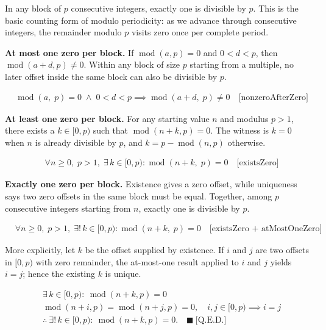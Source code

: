 In any block of $p$ consecutive integers, exactly one is divisible by $p$.
This is the basic counting form of modulo periodicity: as we advance through
consecutive integers, the remainder modulo $p$ visits zero once per complete
period.

\textbf{At most one zero per block.} If $\operatorname{mod}(a,p)=0$ and
$0 < d < p$, then $\operatorname{mod}(a+d,p)\neq 0$. Within any block of
size $p$ starting from a multiple, no later offset inside the same block can
also be divisible by $p$.

\begin{equation*}
\begin{aligned}
&\operatorname{mod}(a,\; p) = 0 \;\land\; 0 < d < p
  \implies \operatorname{mod}(a + d,\; p) \neq 0
  \quad \text{[nonzeroAfterZero]}
\end{aligned}
\end{equation*}

\textbf{At least one zero per block.} For any starting value $n$ and modulus
$p>1$, there exists a $k \in [0,p)$ such that
$\operatorname{mod}(n+k,p)=0$. The witness is $k=0$ when $n$ is already
divisible by $p$, and $k=p-\operatorname{mod}(n,p)$ otherwise.

\begin{equation*}
\begin{aligned}
&\forall n \geq 0,\; p > 1,\; \exists\, k \in [0, p) :
  \operatorname{mod}(n + k,\; p) = 0
  \quad \text{[existsZero]}
\end{aligned}
\end{equation*}

\textbf{Exactly one zero per block.} Existence gives a zero offset, while
uniqueness says two zero offsets in the same block must be equal. Together,
among $p$ consecutive integers starting from $n$, exactly one is divisible
by $p$.

\begin{equation*}
\begin{aligned}
&\forall n \geq 0,\; p > 1,\; \exists!\, k \in [0, p) :
  \operatorname{mod}(n + k,\; p) = 0
  \quad \text{[existsZero + atMostOneZero]}
\end{aligned}
\end{equation*}

More explicitly, let $k$ be the offset supplied by existence. If $i$ and
$j$ are two offsets in $[0,p)$ with zero remainder, the at-most-one result
applied to $i$ and $j$ yields $i=j$; hence the existing $k$ is unique.

\begin{equation*}
\begin{aligned}
&\exists\, k\in[0,p):\ \operatorname{mod}(n+k,p)=0 \\
&\operatorname{mod}(n+i,p)=\operatorname{mod}(n+j,p)=0,\quad i,j\in[0,p)
  \implies i=j \\
&\therefore\ \exists!\, k\in[0,p):\ \operatorname{mod}(n+k,p)=0.
  \quad \blacksquare\ \text{[Q.E.D.]}
\end{aligned}
\end{equation*}

